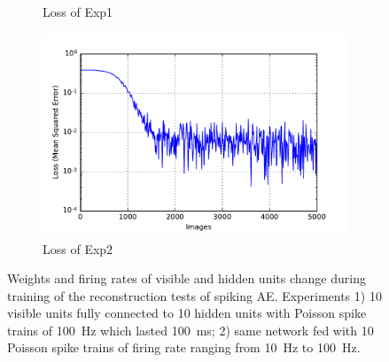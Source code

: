 \begin{figure}
\begin{subfigure}[t]{0.4\textwidth}
		\caption{Loss of Exp1}
	\end{subfigure}
	\begin{subfigure}[t]{0.4\textwidth}
		\includegraphics[width=\textwidth]{pics_sdlm/01_exp_SAE_Orig_long/exp2_mse_nons.pdf}
		\caption{Loss of Exp2}
	\end{subfigure}
	\caption{Weights and firing rates of visible and hidden units change during training of the reconstruction tests of spiking AE. 
		Experiments 1) 10 visible units fully connected to 10 hidden units with Poisson spike trains of 100~Hz which lasted 100~ms; 2) same network fed with 10 Poisson spike trains of firing rate ranging from 10~Hz to 100~Hz.}
\end{figure}

